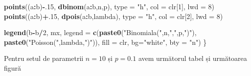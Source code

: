 \documentclass[]{article}
\newenvironment{Shaded}{\begin{snugshade}}{\end{snugshade}}
\newcommand{\DataTypeTok}[1]{\textcolor[rgb]{0.13,0.29,0.53}{#1}}
\newcommand{\DecValTok}[1]{\textcolor[rgb]{0.00,0.00,0.81}{#1}}
\newcommand{\KeywordTok}[1]{\textcolor[rgb]{0.13,0.29,0.53}{\textbf{#1}}}
\newcommand{\NormalTok}[1]{#1}
\newcommand{\OperatorTok}[1]{\textcolor[rgb]{0.81,0.36,0.00}{\textbf{#1}}}
\newcommand{\StringTok}[1]{\textcolor[rgb]{0.31,0.60,0.02}{#1}}
\begin{document}
\begin{Shaded}
\begin{Highlighting}[]
    \KeywordTok{points}\NormalTok{((a}\OperatorTok{:}\NormalTok{b)}\OperatorTok{-}\NormalTok{.}\DecValTok{15}\NormalTok{, }\KeywordTok{dbinom}\NormalTok{(a}\OperatorTok{:}\NormalTok{b,n,p), }\DataTypeTok{type =} \StringTok{"h"}\NormalTok{,}
           \DataTypeTok{col =}\NormalTok{ clr[}\DecValTok{1}\NormalTok{], }\DataTypeTok{lwd =} \DecValTok{8}\NormalTok{)}
    \KeywordTok{points}\NormalTok{((a}\OperatorTok{:}\NormalTok{b)}\OperatorTok{+}\NormalTok{.}\DecValTok{15}\NormalTok{, }\KeywordTok{dpois}\NormalTok{(a}\OperatorTok{:}\NormalTok{b,lambda), }\DataTypeTok{type =} \StringTok{"h"}\NormalTok{,}
           \DataTypeTok{col =}\NormalTok{ clr[}\DecValTok{2}\NormalTok{], }\DataTypeTok{lwd =} \DecValTok{8}\NormalTok{)}
    
    \KeywordTok{legend}\NormalTok{(b}\OperatorTok{-}\NormalTok{b}\OperatorTok{/}\DecValTok{2}\NormalTok{, mx, }\DataTypeTok{legend =} \KeywordTok{c}\NormalTok{(}\KeywordTok{paste0}\NormalTok{(}\StringTok{"Binomiala("}\NormalTok{,n,}\StringTok{","}\NormalTok{,p,}\StringTok{")"}\NormalTok{),}
                               \KeywordTok{paste0}\NormalTok{(}\StringTok{"Poisson("}\NormalTok{,lambda,}\StringTok{")"}\NormalTok{)), }
           \DataTypeTok{fill =}\NormalTok{ clr, }\DataTypeTok{bg=}\StringTok{"white"}\NormalTok{,}
           \DataTypeTok{bty =} \StringTok{"n"}\NormalTok{)}
\NormalTok{\}}
\end{Highlighting}
\end{Shaded}

Pentru setul de parametrii \(n=10\) și \(p=0.1\) avem următorul tabel și
următoarea figură
\end{document}
